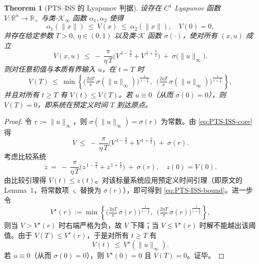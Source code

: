 \documentclass[pdflatex,sn-mathphys-num]{sn-jnl}%
\theoremstyle{thmstyleone}%
\newtheorem{theorem}{Theorem}%
\theoremstyle{thmstyletwo}%
\theoremstyle{thmstylethree}%
\begin{document}
	\begin{theorem}[PTS--ISS 的 Lyapunov 判据]\label{thm:PTS-ISS}
	设存在 $C^1$ Lyapunov 函数 $V:\mathbb{R}^n\to\mathbb{R}_+$ 与类-$\mathcal{K}_\infty$ 函数 $\alpha_1,\alpha_2$ 使得
	\[
	\alpha_1(\|x\|)\ \le\ V(x)\ \le\ \alpha_2(\|x\|),\quad V(0)=0,
	\]
	并存在给定参数 $T>0,\ \eta\in(0,1)$ 以及类-$\mathcal{K}$ 函数 $\sigma(\cdot)$，使对所有 $(x,u)$ 成立
	\begin{equation}\label{eq:PTS-ISS-core}
	\dot V(x,u)\ \le\ -\,\frac{\pi}{\eta\,T}\Big(V^{\,1-\frac{\eta}{2}}+V^{\,1+\frac{\eta}{2}}\Big)\ +\ \sigma\big(\|u\|_\infty\big).
	\end{equation}
	则对任意初值与本质有界输入 $u$，在 $t=T$ 时
	\begin{equation}\label{eq:PTS-ISS-bound}
	V(T)\ \le\ \min\!\left\{
	\Big(\tfrac{2\eta T}{\pi}\,\sigma(\|u\|_\infty)\Big)^{\!\frac{1}{\,1-\frac{\eta}{2}\,}},
	\ \ 
	\Big(\tfrac{2\eta T}{\pi}\,\sigma(\|u\|_\infty)\Big)^{\!\frac{1}{\,1+\frac{\eta}{2}\,}}
	\right\},
	\end{equation}
	并且对所有 $t\ge T$ 有 $V(t)\le V(T)$。若 $u\equiv 0$（从而 $\sigma(0)=0$），则 $V(T)=0$，即系统在预定义时间 $T$ 到达原点。
	\end{theorem}
	
	\begin{proof}
	令 $r:=\|u\|_\infty$，则 $\sigma(\|u\|_\infty)=\sigma(r)$ 为常数。由 \cref{eq:PTS-ISS-core} 得
	\[
	\dot V\ \le\ -\,\frac{\pi}{\eta\,T}\Big(V^{\,1-\frac{\eta}{2}}+V^{\,1+\frac{\eta}{2}}\Big)\ +\ \sigma(r).
	\]
	考虑比较系统
	\[
	\dot z\ =\ -\,\frac{\pi}{\eta\,T}\Big(z^{\,1-\frac{\eta}{2}}+z^{\,1+\frac{\eta}{2}}\Big)\ +\ \sigma(r),\quad z(0)=V(0).
	\]
	由比较引理得 $V(t)\le z(t)$。对该标量系统应用预定义时间引理（即原文的 Lemma~1，将常数项 $\varsigma$ 替换为 $\sigma(r)$），即可得到 \cref{eq:PTS-ISS-bound}。进一步令
\[
V^\star(r):=\min\!\left\{
\Big(\tfrac{2\eta T}{\pi}\,\sigma(r)\Big)^{\!\frac{1}{1-\frac{\eta}{2}}},
\ \ 
\Big(\tfrac{2\eta T}{\pi}\,\sigma(r)\Big)^{\!\frac{1}{1+\frac{\eta}{2}}}
\right\},
\]
则当 $V>V^\star(r)$ 时右端严格为负，故 $V$ 下降；当 $V\le V^\star(r)$ 时解不能越出该阈值。由于 $V(T)\le V^\star(r)$，于是对所有 $t\ge T$ 有
\[
V(t)\ \le\ V^\star(\|u\|_\infty).
\]
若 $u\equiv0$（从而 $\sigma(0)=0$），则 $V^\star(0)=0$ 且 $V(T)=0$。证毕。

	\end{proof}
	
\end{document}
